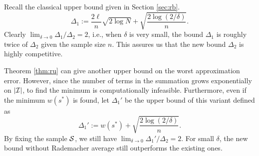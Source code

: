 \documentclass{article}
\begin{document}
Recall the classical upper bound given in Section \ref{sec:rb}.
$$\Delta_1 := \frac{2\ell}{n}\sqrt{2\log N} + \sqrt{\frac{2\log(2/\delta)}{n}}.$$
Clearly $\lim_{\delta\to 0}\Delta_1/\Delta_2 = 2$, i.e., when $\delta$ is very small, the bound $\Delta_1$ is roughly twice of $\Delta_2$ given the sample size $n$.
This assures us that the new bound $\Delta_2$ is highly competitive.

Theorem \ref{thm:ru} can give another upper bound on the worst approximation error. However, since the number of terms in the summation grows exponentially on $|\mathcal{I}|$, to find the minimum is computationally infeasible. Furthermore, even if the minimum $w(s^*)$ is found, let $\Delta_1'$ be the upper bound of this variant defined as 
$$\Delta_1' := w(s^*) + \sqrt{\frac{2\log(2/\delta)}{n}}.$$
By fixing the sample $\mathcal{S}$, we still have $\lim_{\delta\to 0}\Delta_1'/\Delta_2 = 2$. For small $\delta$, the new bound without Rademacher average still outperforms the existing ones.

%


\end{document}
